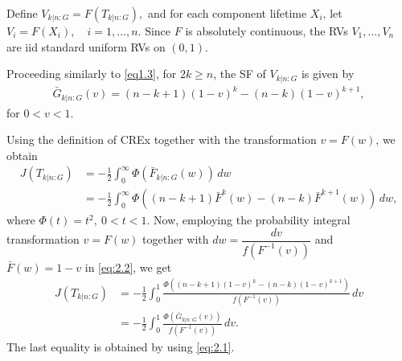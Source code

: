 \documentclass[12pt,a4paper]{article}
\numberwithin{equation}{section}
\begin{document}
Define
$
V_{k|n:G}=F(T_{k|n:G}),
$
and for each component lifetime $X_i$, let
$
V_i=F(X_i), \quad i=1,\ldots,n.
$
Since $F$ is absolutely continuous, the RVs $V_1,\ldots,V_n$ are iid standard uniform RVs on $(0,1)$.

Proceeding similarly to \eqref{eq1.3}, for  $2k\geq n$, the SF of $V_{k|n:G}$ is given by
\begin{align}\label{eq:2.1}
\bar G_{k|n:G}(v)
=
(n-k+1)(1-v)^k
-(n-k)(1-v)^{k+1},
\end{align}
for $0<v<1$.

Using the definition of CREx together with the transformation $v=F(w)$, we obtain
\begin{align}
J(T_{k|n:G})
&=
-\frac12\int_0^\infty
\Phi\!\left(
\bar F_{k|n:G}(w)
\right)\,dw \nonumber\\
&=
-\frac12\int_0^\infty
\Phi\!\left(
(n-k+1)\bar F^k(w)
-(n-k)\bar F^{k+1}(w)
\right)\,dw,
\label{eq:2.2}
\end{align}
where $\Phi(t)=t^2, ~0<t<1$.
Now, employing the probability integral transformation $v=F(w)$ together with
$
dw=\dfrac{dv}{f(F^{-1}(v))}
$
and $\bar F(w)=1-v$ in \eqref{eq:2.2}, we get
\begin{align}
J(T_{k|n:G})
&=
-\frac12
\int_0^1
\frac{
\Phi\!\left(
(n-k+1)(1-v)^k
-(n-k)(1-v)^{k+1}
\right)
}{
f(F^{-1}(v))
}\,dv \nonumber\\
&=
-\frac12
\int_0^1
\frac{
\Phi\!\left(
\bar G_{k|n:G}(v)
\right)
}{
f(F^{-1}(v))
}\,dv.
\end{align}
The last equality is obtained by using \eqref{eq:2.1}.
\end{document}
